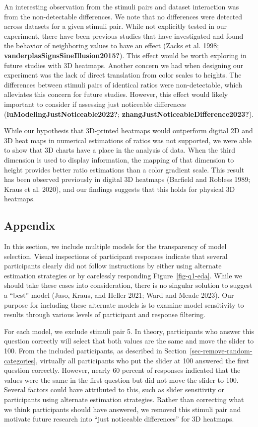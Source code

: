 \documentclass[
  letterpaper,
  DIV=11,
  numbers=noendperiod]{scrartcl}
\begin{document}
An interesting observation from the stimuli pairs and dataset
interaction was from the non-detectable differences. We note that no
differences were detected across datasets for a given stimuli pair.
While not explicitly tested in our experiment, there have been previous
studies that have investigated and found the behavior of neighboring
values to have an effect (Zacks et al. 1998;
\textbf{vanderplasSignsSineIllusion2015?}). This effect would be worth
exploring in future studies with 3D heatmaps. Another concern we had
when designing our experiment was the lack of direct translation from
color scales to heights. The differences between stimuli pairs of
identical ratios were non-detectable, which alleviates this concern for
future studies. However, this effect would likely important to consider
if assessing just noticeable differences
(\textbf{luModelingJustNoticeable2022?};
\textbf{zhangJustNoticeableDifference2023?}).

While our hypothesis that 3D-printed heatmaps would outperform digital
2D and 3D heat maps in numerical estimations of ratios was not
supported, we were able to show that 3D charts have a place in the
analysis of data. When the third dimension is used to display
information, the mapping of that dimension to height provides better
ratio estimations than a color gradient scale. This result has been
observed previously in digital 3D heatmaps (Barfield and Robless 1989;
Kraus et al. 2020), and our findings suggests that this holds for
physical 3D heatmaps.

\subsection{Appendix}\label{appendix}

In this section, we include multiple models for the transparency of
model selection. Visual inspections of participant responses indicate
that several participants clearly did not follow instructions by either
using alternate estimation strategies or by carelessly responding
Figure~\ref{fig-q1-eda}. While we should take these cases into
consideration, there is no singular solution to suggest a ``best'' model
(Jaso, Kraus, and Heller 2021; Ward and Meade 2023). Our purpose for
including these alternate models is to examine model sensitivity to
results through various levels of participant and response filtering.

For each model, we exclude stimuli pair 5. In theory, participants who
answer this question correctly will select that both values are the same
and move the slider to 100. From the included participants, as described
in Section~\ref{sec-remove-random-categories}, virtually all
participants who put the slider at 100 answered the first question
correctly. However, nearly 60 percent of responses indicated that the
values were the same in the first question but did not move the slider
to 100. Several factors could have attributed to this, such as slider
sensitivity or participants using alternate estimation strategies.
Rather than correcting what we think participants should have answered,
we removed this stimuli pair and motivate future research into ``just
noticeable differences'' for 3D heatmaps.
\end{document}
